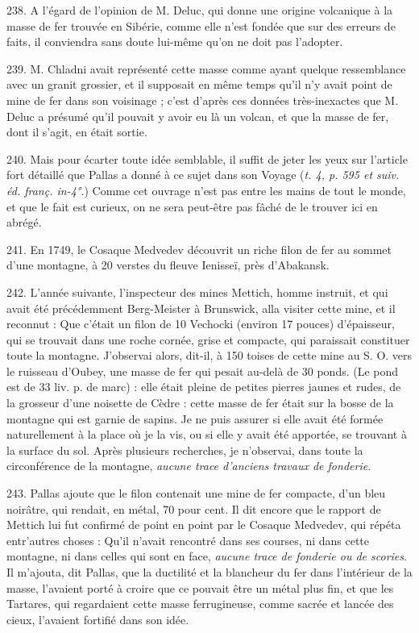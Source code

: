 \documentclass[a4paper, 11pt, oneside, polutonikogreek, french]{article}
\begin{document}
238. A l'égard de l'opinion de M. Deluc, qui donne une origine volcanique à la masse de fer trouvée en Sibérie, comme elle n'est fondée que sur des erreurs de faits, il conviendra sans doute lui-même qu'on ne doit pas l'adopter.

239. M. Chladni avait représenté cette masse comme ayant quelque ressemblance avec un granit grossier, et il supposait en même temps qu'il n'y avait point de mine de fer dans son voisinage ; c'est d'après ces données très-inexactes que M. Deluc a présumé qu'il pouvait y avoir eu là un volcan, et que la masse de fer, dont il s'agit, en était sortie.

240. Mais pour écarter toute idée semblable, il suffit de jeter les yeux sur l'article fort détaillé que Pallas a donné à ce sujet dans son Voyage (\emph{t. 4, p. 595 et suiv. éd. franç. in-4°.}) Comme cet ouvrage n'est pas entre les mains de tout le monde, et que le fait est curieux, on ne sera peut-être pas fâché de le trouver ici en abrégé.

241. En 1749, le Cosaque Medvedev découvrit un riche filon de fer au sommet d'une montagne, à 20 verstes du fleuve Ienisseï, près d'Abakansk.

242. L'année suivante, l'inspecteur des mines Mettich, homme instruit, et qui avait été précédemment Berg-Meister à Brunswick, alla visiter cette mine, et il reconnut : \og Que c'était un filon de 10 Vechocki (environ 17 pouces) d'épaisseur, qui se trouvait dans une roche cornée, grise et compacte, qui paraissait constituer toute la montagne. J'observai alors, dit-il, à 150 toises de cette mine au S. O. vers le ruisseau d'Oubey, une masse de fer qui pesait au-delà de 30 ponds. (Le pond est de 33 liv. p. de marc) : elle était pleine de petites pierres jaunes et rudes, de la grosseur d'une noisette de Cèdre : cette masse de fer était sur la bosse de la montagne qui est garnie de sapins. Je ne puis assurer si elle avait été formée naturellement à la place où je la vis, ou si elle y avait été apportée, se trouvant à la surface du sol. Après plusieurs recherches, je n'observai, dans toute la circonférence de la montagne, \emph{aucune trace d'anciens travaux de fonderie}. \fg

243. Pallas ajoute que le filon contenait une mine de fer compacte, d'un bleu noirâtre, qui rendait, en métal, 70 pour cent. Il dit encore que le rapport de Mettich lui fut confirmé de point en point par le Cosaque Medvedev, qui répéta entr'autres choses : \og Qu'il n'avait rencontré dans ses courses, ni dans cette montagne, ni dans celles qui sont en face, \emph{aucune trace de fonderie ou de scories}. Il m'ajouta, dit Pallas, que la ductilité et la blancheur du fer dans l'intérieur de la masse, l'avaient porté à croire que ce pouvait être un métal plus fin, et que les Tartares, qui regardaient cette masse ferrugineuse, comme sacrée et lancée des cieux, l'avaient fortifié dans son idée. \fg
\end{document}
